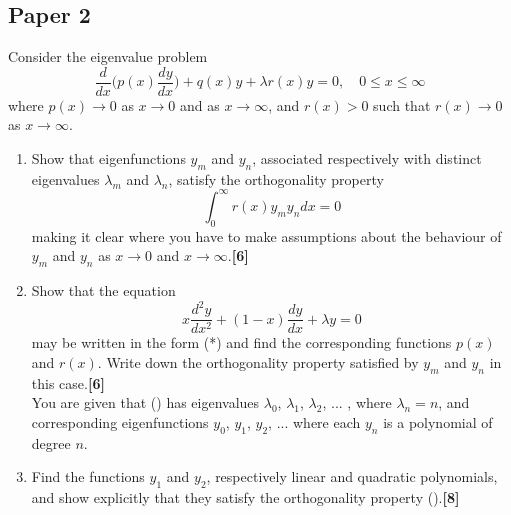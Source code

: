 \documentclass[a4paper]{article}
\begin{document}
\subsection{Paper 2}
\begin{qns}
Consider the eigenvalue problem
\begin{equation}
    \frac{d}{dx}\bigg(p(x)\frac{dy}{dx}\bigg)+q(x)y+\lambda r(x)y=0,\quad 0\leq x\leq\infty\tag{*}
\end{equation}
where $p(x)\rightarrow0$ as $x\rightarrow0$ and as $x\rightarrow\infty$, and $r(x) > 0$ such that $r(x)\rightarrow0$ as $x\rightarrow\infty$.
\begin{enumerate}[label=(\roman*)]
\item Show that eigenfunctions $y_m$ and $y_n$, associated respectively with distinct eigenvalues $\lambda_m$ and $\lambda_n$, satisfy the orthogonality property
\begin{equation}
    \int_0^\infty r(x)y_my_ndx=0\tag{\dag}
\end{equation}
making it clear where you have to make assumptions about the behaviour of $y_m$ and $y_n$ as $x\rightarrow0$ and $x\rightarrow\infty$.\hfill\textbf{[6]}
\item Show that the equation
\begin{equation}
    x\frac{d^2y}{dx^2}+(1-x)\frac{dy}{dx}+\lambda y=0\tag{\ddag}
\end{equation}
may be written in the form (*) and find the corresponding functions $p(x)$ and $r(x)$. Write down the orthogonality property satisfied by $y_m$ and $y_n$ in this case.\hfill\textbf{[6]}\\[5pt]
You are given that (\ddag) has eigenvalues $\lambda_0$, $\lambda_1$, $\lambda_2$, ... , where $\lambda_n=n$, and corresponding eigenfunctions $y_0$, $y_1$, $y_2$, ... where each $y_n$ is a polynomial of degree $n$.
\item Find the functions $y_1$ and $y_2$, respectively linear and quadratic polynomials, and show explicitly that they satisfy the orthogonality property (\dag).\hfill\textbf{[8]}
\end{enumerate}
\end{qns}
\end{document}

